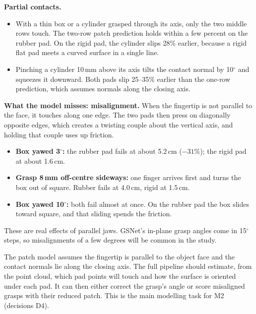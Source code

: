 \documentclass[11pt]{article}
\numberwithin{equation}{section}
\newcommand{\note}[1]{\par\smallskip\noindent\colorbox{notebg}{\parbox{\dimexpr\linewidth-2\fboxsep}{\small #1}}\par\smallskip}
\begin{document}
\textbf{Partial contacts.}
\begin{itemize}
  \item With a thin box or a cylinder grasped through its axis, only the two middle rows touch. The two-row patch prediction holds within a few percent on the rubber pad. On the rigid pad, the cylinder slips 28\% earlier, because a rigid flat pad meets a curved surface in a single line.
  \item Pinching a cylinder 10\,mm above its axis tilts the contact normal by 10$^\circ$ and squeezes it downward. Both pads slip 25--35\% earlier than the one-row prediction, which assumes normals along the closing axis.
\end{itemize}

\textbf{What the model misses: misalignment.} When the fingertip is not parallel to the face, it touches along one edge. The two pads then press on diagonally opposite edges, which creates a twisting couple about the vertical axis, and holding that couple uses up friction.
\begin{itemize}
  \item \textbf{Box yawed 3$^\circ$:} the rubber pad fails at about 5.2\,cm ($-31\%$); the rigid pad at about 1.6\,cm.
  \item \textbf{Grasp 8\,mm off-centre sideways:} one finger arrives first and turns the box out of square. Rubber fails at 4.0\,cm, rigid at 1.5\,cm.
  \item \textbf{Box yawed 10$^\circ$:} both fail almost at once. On the rubber pad the box slides toward square, and that sliding spends the friction.
\end{itemize}
These are real effects of parallel jaws. GSNet's in-plane grasp angles come in 15$^\circ$ steps, so misalignments of a few degrees will be common in the study.
\note{The patch model assumes the fingertip is parallel to the object face and the contact normals lie along the closing axis. The full pipeline should estimate, from the point cloud, which pad points will touch and how the surface is oriented under each pad. It can then either correct the grasp's angle or score misaligned grasps with their reduced patch. This is the main modelling task for M2 (decisions D4).}
\end{document}
